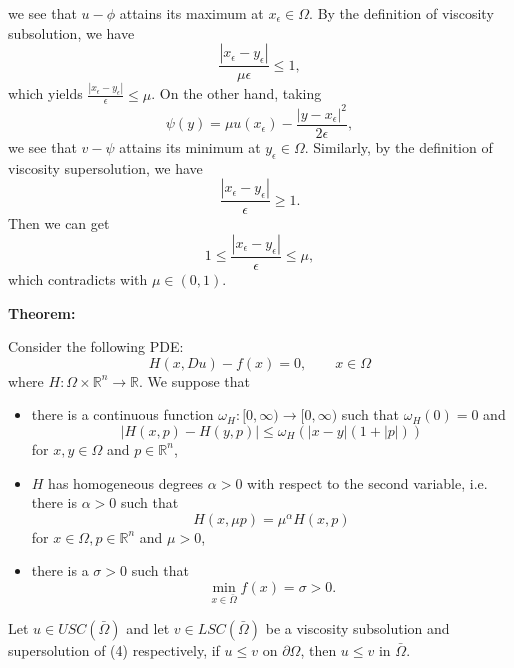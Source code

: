 \documentclass[12pt,a4paper]{ctexart}
\begin{document}
we see that $u - \phi$ attains its maximum at $x_{\epsilon} \in \Omega$. By the definition of viscosity subsolution, we have
\begin{equation*}
    \frac{|x_\epsilon - y_\epsilon|}{\mu \epsilon} \leq 1,
\end{equation*}
which yields $\frac{|x_\epsilon - y_\epsilon|}{\epsilon} \leq \mu$. On the other hand, taking
\begin{equation*}
    \psi (y) = \mu u(x_\epsilon) - \frac{|y - x_\epsilon|^{2}}{2 \epsilon},
\end{equation*}
we see that $v - \psi$ attains its minimum at $y_{\epsilon} \in \Omega$. Similarly, by the definition of viscosity supersolution, we have
\begin{equation*}
    \frac{|x_\epsilon - y_\epsilon|}{\epsilon} \geq 1.
\end{equation*}
Then we can get
\begin{equation*}
    1 \leq \frac{|x_\epsilon - y_\epsilon|}{\epsilon} \leq \mu,
\end{equation*}
which contradicts with $\mu \in (0,1)$.

\vspace{8pt}

\textbf{Theorem:}

Consider the following PDE:
\begin{equation}
    H(x, Du) - f(x) = 0, \qquad x \in \Omega
\end{equation}
where $H: \Omega \times \mathbb{R}^{n} \to \mathbb{R}$. We suppose that
\begin{itemize}
    \item there is a continuous function $\omega_{H}: [0, \infty) \to [0, \infty)$ such that $\omega_{H}(0) = 0$ and 
    \begin{equation*}
        |H(x, p) - H(y, p)| \leq \omega_{H}(|x - y|(1 + |p|))
    \end{equation*}
    for $x, y \in \Omega$ and $p \in \mathbb{R}^{n}$,
    \item $H$ has homogeneous degrees $\alpha > 0$ with respect to the second variable, i.e. there is $\alpha > 0$ such that
    \begin{equation*}
        H(x, \mu p) = \mu^{\alpha} H(x, p)
    \end{equation*}
    for $x \in \Omega, p \in \mathbb{R}^{n}$ and $\mu > 0$,
    \item there is a $\sigma > 0$ such that
    \begin{equation*}
        \min_{x \in \bar \Omega} f(x) = \sigma > 0.
    \end{equation*}
\end{itemize}
Let $u \in USC(\bar \Omega)$ and let $v \in LSC(\bar \Omega)$ be a viscosity subsolution and supersolution of (4) respectively, if $u \leq v$ on $\partial \Omega$, then $u \leq v$ in $\bar \Omega$.
\end{document}
